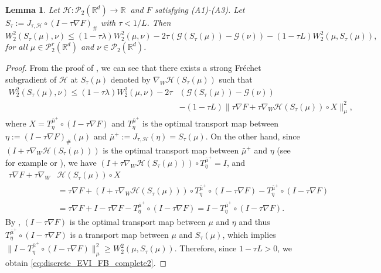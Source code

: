 \documentclass[11pt]{article}
\newtheorem{lemma}[theorem]{Lemma}
\newcommand{\cP}{\mathcal{P}}
\newcommand{\cG}{\mathcal{G}}
\newcommand{\cT}{S}
\newcommand{\calH}{\mathcal{H}}
\newcommand{\R}{\mathbb{R}}
\numberwithin{equation}{section}
\begin{document}
\begin{lemma}\label{lem:discreteEVI}
	Let $\mathcal{H} : \cP_2(\R^d) \to \mathbb{R} \ $ and $F$ satisfying (A1)-(A3). Let $\cT_{\tau}:=J_{\tau , \calH}\circ (I-\tau \nabla F)_{\#}$ with $\tau < 1/L$. Then
	\begin{equation}\label{eq:discrete_EVI_FB_complete2}
		W_2^2(\cT_\tau(\mu), \nu)\leq (1-\tau \lambda)W_2^2(\mu,\nu)-2\tau (\cG(\cT_\tau(\mu))-\cG(\nu))-(1-\tau L)W_2^2(\mu,\cT_\tau(\mu)),
	\end{equation}
	for all $\mu \in \cP_2^r(\R^d)$ and $\nu\in \cP_2(\R^d)$.
\end{lemma}
\begin{proof}
	From the proof of \cite[Proposition 8]{WPG2020}, we can see that there exists a strong Fréchet subgradient of $\mathcal{H}$ at $\cT_{\tau}(\mu)$ denoted by $\nabla_W \mathcal{H} (\cT_{\tau}(\mu))$ such that
	\begin{equation*}\label{eq:discrete_EVI_FB_complete1}
		\begin{aligned}
			W_2^2(\cT_\tau(\mu), \nu)\leq (1-\tau \lambda)W_2^2(\mu,\nu)-2\tau & (\cG(\cT_\tau(\mu))-\cG(\nu))\\ &-(1-\tau L)\|\tau \nabla F + \tau \nabla_W\mathcal{H}(\cT_\tau(\mu))\circ X\|_{\mu}^2,
		\end{aligned}
	\end{equation*}
	where $X=T_{\eta}^{\bar \mu^+}\circ (I-\tau \nabla F)$ and $T_{\eta}^{\bar \mu^+}$ is the optimal transport map between $\eta:=(I-\tau \nabla F)_{\#}(\mu)$ and $\bar{\mu}^+:=J_{\tau,\mathcal{H}}(\eta)=\cT_\tau(\mu)$. On the other hand, since $\left(I+\tau \nabla_W \mathcal{H}(\cT_\tau(\mu))\right)$ is the optimal transport map between $\bar \mu^+$ and $\eta$ (see for example \cite[Lemma 3]{WPG2020} or \cite{AGS08}), we have $\left(I+\tau \nabla_W \mathcal{H}(\cT_\tau(\mu))\right)\circ T_{\eta}^{\bar \mu^+}= I$, and
	\begin{equation}
		\begin{aligned}
			\tau \nabla F + \tau \nabla_W & \mathcal{H}(\cT_\tau(\mu))\circ X\\ & = \tau \nabla F + \left(I+\tau \nabla_W \mathcal{H}(\cT_\tau(\mu))\right)\circ T_{\eta}^{\bar \mu^+}\circ (I-\tau \nabla F) - T_{\eta}^{\bar \mu^+}\circ (I-\tau \nabla F)\\
			& = \tau \nabla F + I-\tau \nabla F - T_{\eta}^{\bar \mu^+}\circ (I-\tau \nabla F) = I - T_{\eta}^{\bar \mu^+}\circ (I-\tau \nabla F).
		\end{aligned}
	\end{equation}
	By \cite[Lemma 2]{WPG2020}, $(I-\tau \nabla F)$ is the optimal transport map between $\mu$ and $\eta$ and thus $T_{\eta}^{\bar \mu^+}\circ (I-\tau \nabla F)$ is a transport map between $\mu$ and $\cT_\tau(\mu)$, which implies $\|I - T_{\eta}^{\bar \mu^+}\circ (I-\tau \nabla F)\|_{\mu}^2\geq W_2^2(\mu,\cT_\tau(\mu))$. Therefore, since $1-\tau L > 0$, we obtain \eqref{eq:discrete_EVI_FB_complete2}.
\end{proof}
\end{document}
